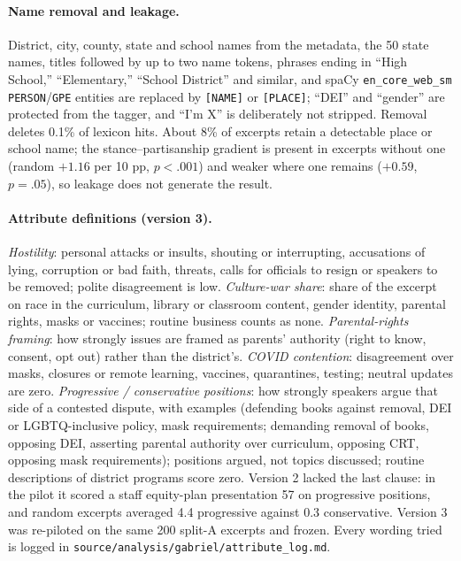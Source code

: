 \paragraph{Name removal and leakage.}
District, city, county, state and school names from the metadata, the 50 state names, titles followed by up to two name tokens, phrases ending in ``High School,'' ``Elementary,'' ``School District'' and similar, and spaCy \texttt{en\_core\_web\_sm} \texttt{PERSON}/\texttt{GPE} entities are replaced by \texttt{[NAME]} or \texttt{[PLACE]}; ``DEI'' and ``gender'' are protected from the tagger, and ``I'm X'' is deliberately not stripped. Removal deletes 0.1\% of lexicon hits. About 8\% of excerpts retain a detectable place or school name; the stance--partisanship gradient is present in excerpts without one (random $+1.16$ per 10 pp, $p<.001$) and weaker where one remains ($+0.59$, $p=.05$), so leakage does not generate the result.

\paragraph{Attribute definitions (version 3).}
\emph{Hostility}: personal attacks or insults, shouting or interrupting, accusations of lying, corruption or bad faith, threats, calls for officials to resign or speakers to be removed; polite disagreement is low. \emph{Culture-war share}: share of the excerpt on race in the curriculum, library or classroom content, gender identity, parental rights, masks or vaccines; routine business counts as none. \emph{Parental-rights framing}: how strongly issues are framed as parents' authority (right to know, consent, opt out) rather than the district's. \emph{COVID contention}: disagreement over masks, closures or remote learning, vaccines, quarantines, testing; neutral updates are zero. \emph{Progressive / conservative positions}: how strongly speakers argue that side of a contested dispute, with examples (defending books against removal, DEI or LGBTQ-inclusive policy, mask requirements; demanding removal of books, opposing DEI, asserting parental authority over curriculum, opposing CRT, opposing mask requirements); positions argued, not topics discussed; routine descriptions of district programs score zero. Version 2 lacked the last clause: in the pilot it scored a staff equity-plan presentation 57 on progressive positions, and random excerpts averaged 4.4 progressive against 0.3 conservative. Version 3 was re-piloted on the same 200 split-A excerpts and frozen. Every wording tried is logged in \texttt{source/analysis/gabriel/attribute\_log.md}.

